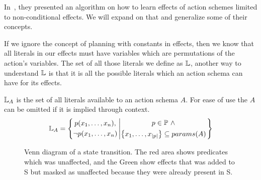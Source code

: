\documentclass[../Master.tex]{subfiles}
\begin{document}
In~\cite{Walsh2008}, they presented an algorithm on how to learn effects of action schemes limited to non-conditional effects. We will expand on that and generalize some of their concepts.

If we ignore the concept of planning with constants in effects, then we know that all literals in our effects must have variables which are permutations of the action's variables. The set of all those literals we define as $\mathbb{L}$, another way to understand $\mathbb{L}$ is that it is all the possible literals which an action schema can have for its effects.

\begin{definition} 
$\mathbb{L}_A$ is the set of all literals available to an action schema $A$. For ease of use the $A$ can be omitted if it is implied through context.
	\begin{equation*}
		\mathbb{L}_A = \left\{ 
				\begin{gathered}
					p(x_1,\dots,x_n), \\
					\neg p(x_1,\dots,x_n)
				\end{gathered}
					\left|
				\begin{gathered} p \in \mathbb{P}~\land \\
                    \left\{ x_1,\dots,x_{|p|} \right\} \subseteq params(A)
				\end{gathered}				
							\right.\right\}
	\end{equation*}
\end{definition}


\begin{figure}
	\def\firstcircle{(0,0) circle (1.5cm)}
	\def\secondcircle{(0:2cm) circle (1.5cm)}
	\def\thirdcircle{(0:3.8cm) circle (2.9cm)}
	\centering
\caption{\label{fig:nca:venn-of-effects} Venn diagram of a state transition. The red area shows predicates which was unaffected, and the Green show effects that was added to S but masked as unaffected because they were already present in S.}

\end{figure}
\end{document}
